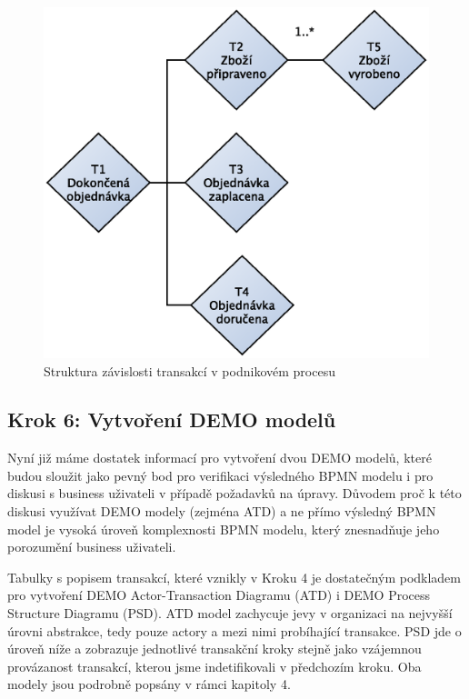 \documentclass[]{article}
\begin{document}
\begin{figure}[H]\centering
\includegraphics[width=1.0\textwidth]{obrazky/result-structure-chart}
\caption{Struktura závislosti transakcí v podnikovém procesu}
\label{fig:result_structure_chart}
\end{figure}

\subsection{Krok 6: Vytvoření DEMO modelů}
Nyní již máme dostatek informací pro vytvoření dvou DEMO modelů, které budou sloužit jako pevný bod pro verifikaci výsledného BPMN modelu i pro diskusi s business uživateli v případě požadavků na úpravy. Důvodem proč k této diskusi využívat DEMO modely (zejména ATD) a ne přímo výsledný BPMN model je vysoká úroveň komplexnosti BPMN modelu, který znesnadňuje jeho porozumění business uživateli.

Tabulky s popisem transakcí, které vznikly v Kroku 4 je dostatečným podkladem pro vytvoření DEMO Actor-Transaction Diagramu (ATD) i DEMO Process Structure Diagramu (PSD). ATD model zachycuje jevy v organizaci na nejvyšší úrovni abstrakce, tedy pouze actory a mezi nimi probíhající transakce. PSD jde o úroveň níže a zobrazuje jednotlivé transakční kroky stejně jako vzájemnou provázanost transakcí, kterou jsme indetifikovali v předchozím kroku. Oba modely jsou podrobně popsány v rámci kapitoly 4.
\end{document}
